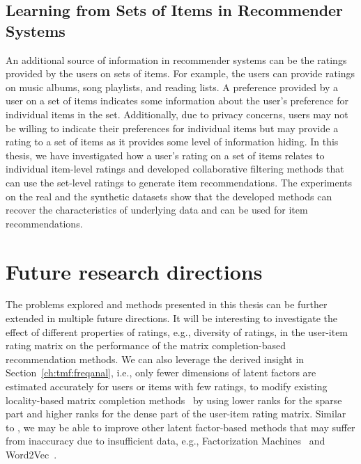 \subsection*{Learning from Sets of Items in Recommender Systems}
An additional source of information in recommender systems can be the ratings provided by the users on sets
of items. For example,  the users can provide ratings on music albums, song playlists, and reading lists. 
A preference provided by a user on a set of items indicates some information about the user's preference for
individual items in the set. Additionally, due to privacy concerns, users may not be willing to indicate their
preferences for individual items but may provide a rating to a set of items as it provides some level of
information hiding. In this thesis, we have investigated how a user's rating on a set of items relates to
individual item-level ratings and developed collaborative filtering methods that can use the set-level ratings
to generate item recommendations. 
The experiments on the real and the synthetic datasets show that the developed methods can recover the
characteristics of underlying data and can be used for item recommendations.





\section{Future research directions}
The problems explored and methods presented in this thesis can be further extended in multiple future directions. It will be interesting to investigate the effect of different properties of ratings, e.g., diversity of ratings, in the user-item rating matrix on the performance of the matrix completion-based recommendation methods.
We can also leverage the derived insight in Section~\ref{ch:tmf:freqanal}, i.e., only fewer dimensions of latent factors are estimated accurately for users or items with few ratings,  to modify
existing locality-based  matrix completion methods~\cite{lee2013local,
lee2014local,chen2015wemarec} by using lower ranks for
the sparse part and higher ranks for the dense part of the user-item rating
matrix.
Similar to \TMF, we may be able to improve other latent factor-based methods that may suffer from inaccuracy due to insufficient data, e.g.,  Factorization Machines~\cite{rendle2010factorization,rendle12libfm} and Word2Vec~\cite{mikolov2013distributed}.

